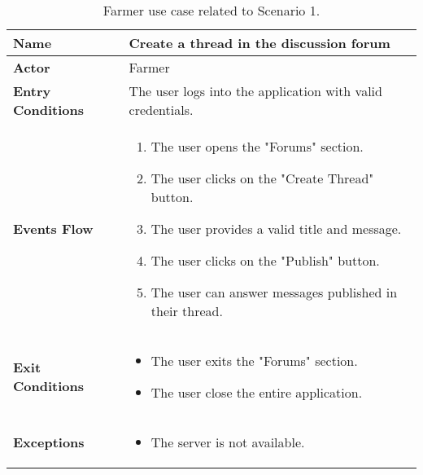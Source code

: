 \begin{table}[hbt!]
\centering
\caption{\label{tab:addOne{table_counter}}Farmer use case related to Scenario 1.}
\renewcommand{\arraystretch}{1.25}
\begin{tabular}{|l|>{\raggedright\arraybackslash}m{12cm}|}
    \hline
    \textbf{Name} & Create a thread in the discussion forum\\
    \hline
   	\textbf{Actor} & Farmer\\
    \hline
    \textbf{Entry Conditions} & The user logs into the application with valid credentials.\\
    \hline
    \textbf{Events Flow} & 
    		\begin{enumerate}
    			\item The user opens the "Forums" section.
    			\item The user clicks on the "Create Thread" button.
    			\item The user provides a valid title and message.
    			\item The user clicks on the "Publish" button.
    			\item The user can answer messages published in their thread.
    		\end{enumerate}
    	\\
    \hline
    \textbf{Exit Conditions} & \begin{itemize}
    	\item The user exits the "Forums" section.
    	\item The user close the entire application.    
    	\end{itemize}
	\\
    \hline
    \textbf{Exceptions} & 
    		\begin{itemize}
    			\item The server is not available.
    		\end{itemize}
    	\\
    \hline
\end{tabular}
\end{table}